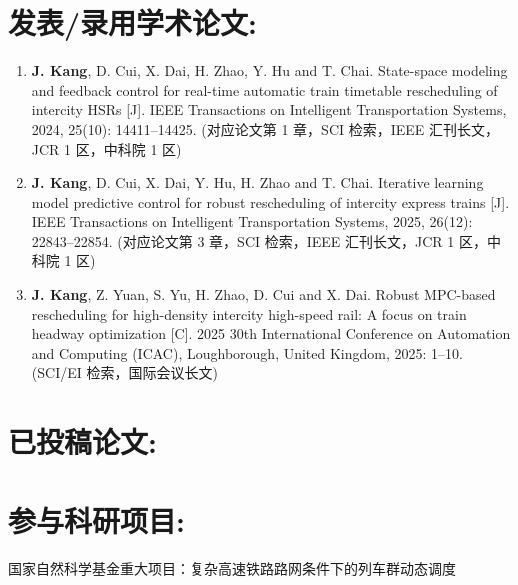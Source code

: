 \section*{发表/录用学术论文:}
    \begin{enumerate}[leftmargin=*]
\item \textbf{J. Kang}, D. Cui, X. Dai, H. Zhao, Y. Hu and T. Chai.
State-space modeling and feedback control for real-time automatic train timetable rescheduling of intercity HSRs [J].
IEEE Transactions on Intelligent Transportation Systems, 2024, 25(10): 14411–14425. (对应论文第 1 章，SCI 检索，IEEE 汇刊长文，JCR 1 区，中科院 1 区)

\item \textbf{J. Kang}, D. Cui, X. Dai, Y. Hu, H. Zhao and T. Chai.
Iterative learning model predictive control for robust rescheduling of intercity express trains [J].
IEEE Transactions on Intelligent Transportation Systems, 2025, 26(12): 22843–22854. (对应论文第 3 章，SCI 检索，IEEE 汇刊长文，JCR 1 区，中科院 1 区)

\item \textbf{J. Kang}, Z. Yuan, S. Yu, H. Zhao, D. Cui and X. Dai.
Robust MPC-based rescheduling for high-density intercity high-speed rail: A focus on train headway optimization [C].
2025 30th International Conference on Automation and Computing (ICAC), Loughborough, United Kingdom, 2025: 1–10. (SCI/EI 检索，国际会议长文)

    \end{enumerate}

    \section*{已投稿论文:}
    \begin{enumerate}[leftmargin=*]
    \end{enumerate}

\section*{参与科研项目:}
国家自然科学基金重大项目：复杂高速铁路路网条件下的列车群动态调度




\cleardoublepage[plain]%

